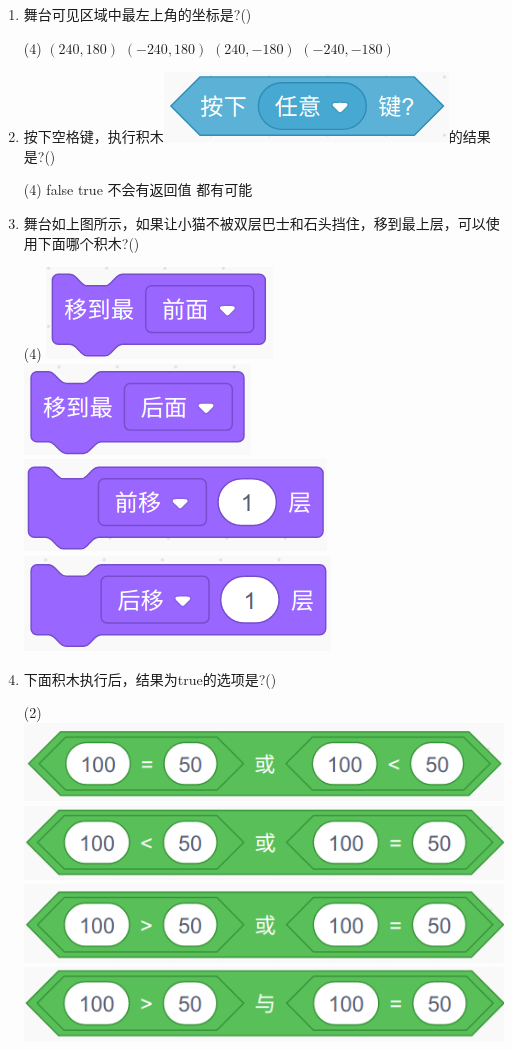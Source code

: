 \documentclass[10pt, a4paper]{article}
\begin{document}
\begin{enumerate}
        \item 舞台可见区域中最左上角的坐标是?(\qquad)
        \begin{tasks}(4)
            \task $(240,180)$
            \task $(-240,180)$
            \task $(240,-180)$
            \task $(-240,-180)$
        \end{tasks}

        \item 按下空格键，执行积木\includegraphics[width=.15\textwidth]{11.png}的结果是?(\qquad)
        \begin{tasks}(4)
            \task false
            \task true
            \task 不会有返回值
            \task 都有可能
        \end{tasks}

        \item 舞台如上图所示，如果让小猫不被双层巴士和石头挡住，移到最上层，可以使用下面哪个积木?(\qquad)
        \begin{tasks}(4)
            \task \includegraphics[width=.13\textwidth]{12a.png}
            \task \includegraphics[width=.13\textwidth]{12b.png}
            \task \includegraphics[width=.13\textwidth]{12c.png}
            \task \includegraphics[width=.13\textwidth]{12d.png}
        \end{tasks}

        \item 下面积木执行后，结果为true的选项是?(\qquad)
        \begin{tasks}(2)
            \task \includegraphics[width=.25\textwidth]{13a.png}
            \task \includegraphics[width=.25\textwidth]{13b.png}
            \task \includegraphics[width=.25\textwidth]{13c.png}
            \task \includegraphics[width=.25\textwidth]{13d.png}
        \end{tasks}


\end{enumerate}
\end{document}
